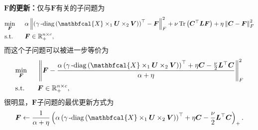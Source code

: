 \textbf{$\boldsymbol{F}$的更新：}仅与$\boldsymbol{F}$有关的子问题为
\begin{equation*}
\begin{aligned}
    &\underset{\mathclap{\boldsymbol{F}}}{\min} \Hquad &&\alpha\norm{\left(\mydiag\left(\mathbfcal{X}\times_{1}\boldsymbol{U}\times_{2}\boldsymbol{V}\right)\right)^{\top} - \boldsymbol{F}}_{F}^{2} + \nu\operatorname{Tr}\left(\boldsymbol{C}^{\top}\boldsymbol{L}\boldsymbol{F}\right) + \eta\norm{\boldsymbol{C}-\boldsymbol{F}}_{F}^{2}\\
    & \text{s.t.} && \boldsymbol{F}\in \mathbb{R}_{+}^{n \times c},
\end{aligned}
\end{equation*}
而这个子问题可以被进一步等价为
\begin{equation*}
    \begin{aligned}
    &\underset{\mathclap{\boldsymbol{F}}}{\min} \Hquad &&\norm{\boldsymbol{F}-\frac{\alpha\left(\mydiag\left(\mathbfcal{X}\times_{1}\boldsymbol{U}\times_{2}\boldsymbol{V}\right)\right)^{\top}+\eta\boldsymbol{C} -\frac{\nu}{2}\boldsymbol{L}^{\top}\boldsymbol{C}}{\alpha+\eta} }_{F}^{2}\\
    & \text{s.t.} && \boldsymbol{F}\in \mathbb{R}_{+}^{n \times c},
    \end{aligned}
\end{equation*}
很明显，$\boldsymbol{F}$子问题的最优更新方式为
\begin{equation}
\label{eq:updateF}
    \boldsymbol{F}\leftarrow\frac{1}{\alpha+\eta}\left(\alpha\left(\mydiag\left(\mathbfcal{X}\times_{1}\boldsymbol{U}\times_{2}\boldsymbol{V}\right)\right)^{\top} +\eta\boldsymbol{C}-\frac{\nu}{2}\boldsymbol{L}^{\top}\boldsymbol{C}\right)_{+}.
\end{equation}

